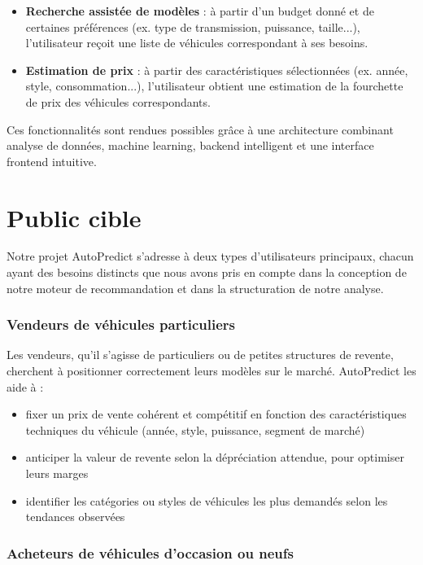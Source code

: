 \documentclass[12pt]{report}
\begin{document}
\begin{itemize}
    \item \textbf{Recherche assistée de modèles} : à partir d’un budget donné et de certaines préférences (ex. type de transmission, puissance, taille...), l’utilisateur reçoit une liste de véhicules correspondant à ses besoins.
    \item \textbf{Estimation de prix} : à partir des caractéristiques sélectionnées (ex. année, style, consommation...), l’utilisateur obtient une estimation de la fourchette de prix des véhicules correspondants.
\end{itemize}

Ces fonctionnalités sont rendues possibles grâce à une architecture combinant analyse de données, machine learning, backend intelligent et une interface frontend intuitive.

\section{Public cible}

Notre projet AutoPredict s’adresse à deux types d’utilisateurs principaux, chacun ayant des besoins distincts que nous avons pris en compte dans la conception de notre moteur de recommandation et dans la structuration de notre analyse.

\subsubsection{Vendeurs de véhicules particuliers}

Les vendeurs, qu’il s’agisse de particuliers ou de petites structures de revente, cherchent à positionner correctement leurs modèles sur le marché. AutoPredict les aide à :
\begin{itemize}
    \item fixer un prix de vente cohérent et compétitif en fonction des caractéristiques techniques du véhicule (année, style, puissance, segment de marché) 
    \item anticiper la valeur de revente selon la dépréciation attendue, pour optimiser leurs marges 
    \item identifier les catégories ou styles de véhicules les plus demandés selon les tendances observées
\end{itemize}

\subsubsection{Acheteurs de véhicules d’occasion ou neufs}
\end{document}
